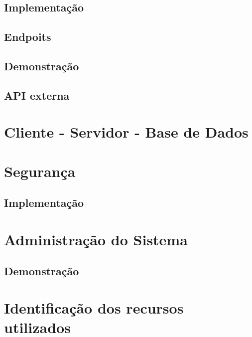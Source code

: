 \documentclass[
  oneside,
  11pt, a4paper,
  footinclude=true,
  headinclude=true,
  cleardoublepage=empty
]{scrbook}
\begin{document}
    \subsection{Implementação}
    
    
    \subsection{Endpoits}
    
    
    \subsection{Demonstração}
    
    
    \subsection{API externa}
    
    
    \newpage
    
    \section{Cliente - Servidor - Base de Dados}
    
    
    \section{Segurança}
    
    
    \subsection{Implementação}
    
    
    \newpage
    
    \section{Administração do Sistema}
    
    
    \subsection{Demonstração}
    
    
    \section{Identificação dos recursos utilizados}
    
    
\end{document}
